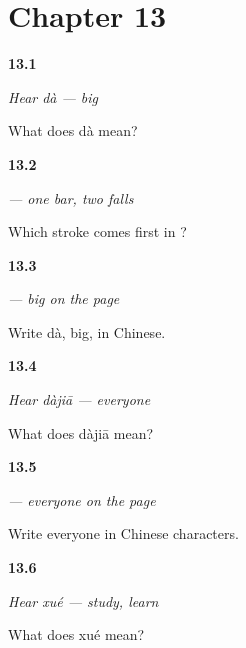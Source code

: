 \section*{Chapter 13}

\noindent\begin{minipage}[t]{\linewidth}
\raggedright
\hypertarget{review-ZH-C13-hear-da-meaning}{\textbf{13.1}} \emph{Hear \emph{dà} — big}\par
\small What does dà mean?
\end{minipage}\par\medskip

\noindent\begin{minipage}[t]{\linewidth}
\raggedright
\hypertarget{review-ZH-W13-da-order}{\textbf{13.2}} \emph{ — one bar, two falls}\par
\small Which stroke comes first in ?
\end{minipage}\par\medskip

\noindent\begin{minipage}[t]{\linewidth}
\raggedright
\hypertarget{review-ZH-C13-da-write}{\textbf{13.3}} \emph{ — big on the page}\par
\small Write dà, big, in Chinese.
\end{minipage}\par\medskip

\noindent\begin{minipage}[t]{\linewidth}
\raggedright
\hypertarget{review-ZH-C13-hear-dajia-meaning}{\textbf{13.4}} \emph{Hear \emph{dàjiā} — everyone}\par
\small What does dàjiā mean?
\end{minipage}\par\medskip

\noindent\begin{minipage}[t]{\linewidth}
\raggedright
\hypertarget{review-ZH-C13-dajia-write}{\textbf{13.5}} \emph{ — everyone on the page}\par
\small Write everyone in Chinese characters.
\end{minipage}\par\medskip

\noindent\begin{minipage}[t]{\linewidth}
\raggedright
\hypertarget{review-ZH-C13-hear-xue-meaning}{\textbf{13.6}} \emph{Hear \emph{xué} — study, learn}\par
\small What does xué mean?
\end{minipage}\par\medskip

